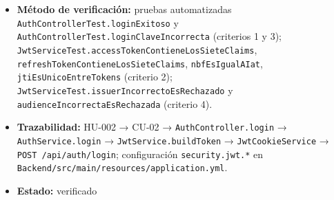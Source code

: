 \documentclass[
  spanish,
]{article}
\providecommand{\tightlist}{%
  \setlength{\itemsep}{0pt}\setlength{\parskip}{0pt}}
\begin{document}
\begin{itemize}
  \begin{enumerate}
  \def\labelenumi{\arabic{enumi}.}
  \tightlist
  \item
    Dadas credenciales válidas, cuando se envía
    \texttt{POST\ /\allowbreak{}api/\allowbreak{}auth/\allowbreak{}login}, entonces la respuesta es
    \texttt{200\ OK} y establece las cookies \texttt{access\_\allowbreak{}token} y
    \texttt{refresh\_\allowbreak{}token} con atributos \texttt{Http\allowbreak{}Only},
    \texttt{Secure} y \texttt{Same\allowbreak{}Site=Strict}.
  \item
    Cada token emitido contiene exactamente los siete claims
    \texttt{iss}, \texttt{sub}, \texttt{aud}, \texttt{exp},
    \texttt{nbf}, \texttt{iat}, \texttt{jti}, con \texttt{nbf\ ==\ iat}
    y \texttt{jti} distinto entre dos tokens emitidos consecutivamente.
  \item
    Dadas credenciales inválidas, cuando se envía la solicitud, entonces
    la respuesta es \texttt{401\ Unauthorized} con
    \texttt{Problem\allowbreak{}Detail} de tipo
    \texttt{urn:biopet:error:\allowbreak{}unauthorized} y no se emite ningún token.
  \item
    Un token con \texttt{iss} o \texttt{aud} distintos de los
    configurados es rechazado.
  \end{enumerate}
\item
  \textbf{Método de verificación:} pruebas automatizadas
  \texttt{Auth\allowbreak{}Controller\allowbreak{}Test.\allowbreak{}login\allowbreak{}Exitoso} y
  \texttt{Auth\allowbreak{}Controller\allowbreak{}Test.\allowbreak{}login\allowbreak{}Clave\allowbreak{}Incorrecta} (criterios 1 y 3);
  \texttt{Jwt\allowbreak{}Service\allowbreak{}Test.\allowbreak{}access\allowbreak{}Token\allowbreak{}Contiene\allowbreak{}Los\allowbreak{}Siete\allowbreak{}Claims},
  \texttt{refresh\allowbreak{}Token\allowbreak{}Contiene\allowbreak{}Los\allowbreak{}Siete\allowbreak{}Claims}, \texttt{nbf\allowbreak{}Es\allowbreak{}Igual\allowbreak{}AIat},
  \texttt{jti\allowbreak{}Es\allowbreak{}Unico\allowbreak{}Entre\allowbreak{}Tokens} (criterio 2);
  \texttt{Jwt\allowbreak{}Service\allowbreak{}Test.\allowbreak{}issuer\allowbreak{}Incorrecto\allowbreak{}Es\allowbreak{}Rechazado} y
  \texttt{audience\allowbreak{}Incorrecta\allowbreak{}Es\allowbreak{}Rechazada} (criterio 4).
\item
  \textbf{Trazabilidad:} HU-002 → CU-02 → \texttt{Auth\allowbreak{}Controller.\allowbreak{}login}
  → \texttt{Auth\allowbreak{}Service.\allowbreak{}login} → \texttt{Jwt\allowbreak{}Service.\allowbreak{}build\allowbreak{}Token} →
  \texttt{Jwt\allowbreak{}Cookie\allowbreak{}Service} → \texttt{POST\ /\allowbreak{}api/\allowbreak{}auth/\allowbreak{}login};
  configuración \texttt{security.\allowbreak{}jwt.*} en
  \texttt{Backend/\allowbreak{}src/\allowbreak{}main/\allowbreak{}resources/\allowbreak{}application.\allowbreak{}yml}.
\item
  \textbf{Estado:} verificado
\end{itemize}
\end{document}
